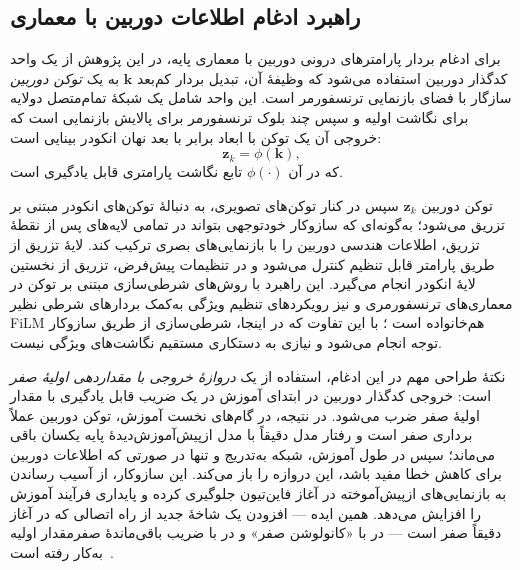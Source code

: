 \subsection{راهبرد ادغام اطلاعات دوربین با معماری }

برای ادغام بردار پارامترهای درونی دوربین با معماری پایه، در این پژوهش از یک واحد کدگذار دوربین استفاده می‌شود که وظیفهٔ آن، تبدیل بردار کم‌بعد $\mathbf{k}$ به یک \emph{توکن دوربین} سازگار با فضای بازنمایی ترنسفورمر است. این واحد شامل یک شبکهٔ تمام‌متصل دولایه برای نگاشت اولیه و سپس چند بلوک ترنسفورمر برای پالایش بازنمایی است که خروجی آن یک توکن با ابعاد برابر با بعد نهان انکودر بینایی است:
\begin{equation}
\mathbf{z}_k = \phi(\mathbf{k}),
\end{equation}
که در آن $\phi(\cdot)$ تابع نگاشت پارامتری قابل یادگیری است.

توکن دوربین $\mathbf{z}_k$ سپس در کنار توکن‌های تصویری، به دنبالهٔ توکن‌های انکودر مبتنی بر  تزریق می‌شود؛ به‌گونه‌ای که سازوکار خودتوجهی بتواند در تمامی لایه‌های پس از نقطهٔ تزریق، اطلاعات هندسی دوربین را با بازنمایی‌های بصری ترکیب کند. لایهٔ تزریق از طریق پارامتر قابل تنظیم
کنترل می‌شود و در تنظیمات پیش‌فرض، تزریق از نخستین لایهٔ انکودر انجام می‌گیرد. این راهبرد با روش‌های شرطی‌سازی مبتنی بر توکن در معماری‌های ترنسفورمری و نیز رویکردهای تنظیم ویژگی به‌کمک بردارهای شرطی نظیر FiLM هم‌خانواده است \cite{Perez2018FiLM}؛ با این تفاوت که در اینجا، شرطی‌سازی از طریق سازوکار توجه انجام می‌شود و نیازی به دستکاری مستقیم نگاشت‌های ویژگی نیست.

نکتهٔ طراحی مهم در این ادغام، استفاده از یک \emph{دروازهٔ خروجی با مقداردهی اولیهٔ صفر} است: خروجی کدگذار دوربین در ابتدای آموزش در یک ضریب قابل یادگیری با مقدار اولیهٔ صفر ضرب می‌شود. در نتیجه، در گام‌های نخست آموزش، توکن دوربین عملاً برداری صفر است و رفتار مدل دقیقاً با مدل ازپیش‌آموزش‌دیدهٔ پایه یکسان باقی می‌ماند؛ سپس در طول آموزش، شبکه به‌تدریج و تنها در صورتی که اطلاعات دوربین برای کاهش خطا مفید باشد، این دروازه را باز می‌کند. این سازوکار، از آسیب رساندن به بازنمایی‌های ازپیش‌آموخته در آغاز فاین‌تیون جلوگیری کرده و پایداری فرآیند آموزش را افزایش می‌دهد. همین ایده --- افزودن یک شاخهٔ جدید از راه اتصالی که در آغاز دقیقاً صفر است --- در  با «کانولوشن صفر» و در  با ضریب باقی‌ماندهٔ صفرمقدار اولیه به‌کار رفته است~\cite{Zhang2023ControlNet,Bachlechner2021ReZero}.

